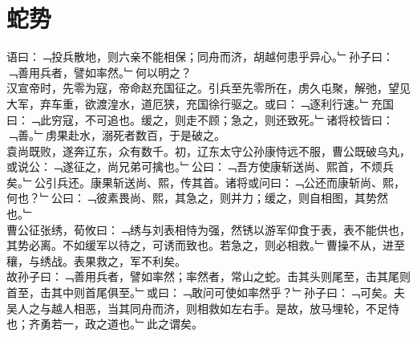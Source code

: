 \chapter{蛇势}%
语曰：﹁投兵散地，则六亲不能相保；同舟而济，胡越何患乎异心。﹂孙子曰：﹁善用兵者，譬如率然。﹂何以明之？\\
汉宣帝时，先零为寇，帝命赵充国征之。引兵至先零所在，虏久屯聚，解弛，望见大军，弃车重，欲渡湟水，道厄狭，充国徐行驱之。或曰：﹁逐利行速。﹂充国曰：﹁此穷寇，不可追也。缓之，则走不顾；急之，则还致死。﹂诸将校皆曰：﹁善。﹂虏果赴水，溺死者数百，于是破之。\\
袁尚既败，遂奔辽东，众有数千。初，辽东太守公孙康恃远不服，曹公既破乌丸，或说公：﹁遂征之，尚兄弟可擒也。﹂公曰：﹁吾方使康斩送尚、熙首，不烦兵矣。﹂公引兵还。康果斩送尚、熙，传其首。诸将或问曰：﹁公还而康斩尚、熙，何也？﹂公曰：﹁彼素畏尚、熙，其急之，则并力；缓之，则自相图，其势然也。﹂\\
曹公征张绣，荀攸曰：﹁绣与刘表相恃为强，然锈以游军仰食于表，表不能供也，其势必离。不如缓军以待之，可诱而致也。若急之，则必相救。﹂曹操不从，进至穰，与绣战。表果救之，军不利矣。\\
故孙子曰：﹁善用兵者，譬如率然；率然者，常山之蛇。击其头则尾至，击其尾则首至，击其中则首尾俱至。﹂或曰：﹁敢问可使如率然乎？﹂孙子曰：﹁可矣。夫吴人之与越人相恶，当其同舟而济，则相救如左右手。是故，放马埋轮，不足恃也；齐勇若一，政之道也。﹂此之谓矣。
%
%
